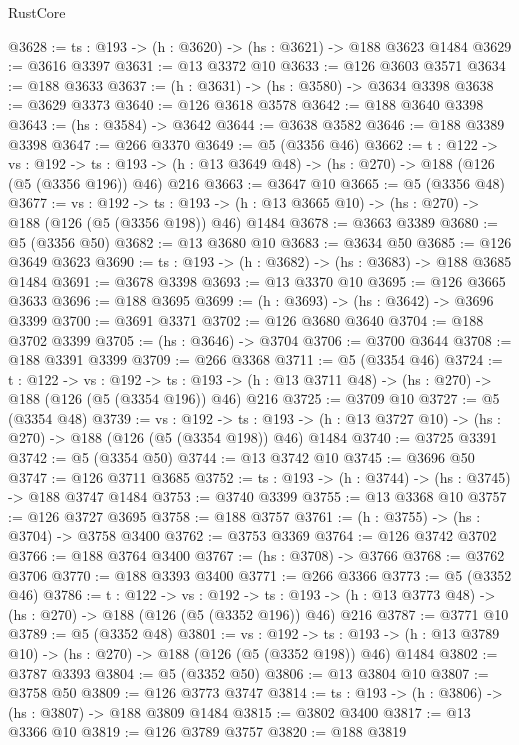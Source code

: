\begin{lexlean}{RustCore}
\begin{coremodule}
@3628 := {ts : @193} -> (h : @3620) -> (hs : @3621) -> @188 @3623 @1484
@3629 := @3616 @3397
@3631 := @13 @3372 @10
@3633 := @126 @3603 @3571
@3634 := @188 @3633
@3637 := (h : @3631) -> (hs : @3580) -> @3634 @3398
@3638 := @3629 @3373
@3640 := @126 @3618 @3578
@3642 := @188 @3640 @3398
@3643 := (hs : @3584) -> @3642
@3644 := @3638 @3582
@3646 := @188 @3389 @3398
@3647 := @266 @3370
@3649 := @5 (@3356 @46)
@3662 := {t : @122} ->
  {vs : @192} ->
  {ts : @193} -> (h : @13 @3649 @48) -> (hs : @270) -> @188 (@126 (@5 (@3356 @196)) @46) @216
@3663 := @3647 @10
@3665 := @5 (@3356 @48)
@3677 := {vs : @192} ->
  {ts : @193} -> (h : @13 @3665 @10) -> (hs : @270) -> @188 (@126 (@5 (@3356 @198)) @46) @1484
@3678 := @3663 @3389
@3680 := @5 (@3356 @50)
@3682 := @13 @3680 @10
@3683 := @3634 @50
@3685 := @126 @3649 @3623
@3690 := {ts : @193} -> (h : @3682) -> (hs : @3683) -> @188 @3685 @1484
@3691 := @3678 @3398
@3693 := @13 @3370 @10
@3695 := @126 @3665 @3633
@3696 := @188 @3695
@3699 := (h : @3693) -> (hs : @3642) -> @3696 @3399
@3700 := @3691 @3371
@3702 := @126 @3680 @3640
@3704 := @188 @3702 @3399
@3705 := (hs : @3646) -> @3704
@3706 := @3700 @3644
@3708 := @188 @3391 @3399
@3709 := @266 @3368
@3711 := @5 (@3354 @46)
@3724 := {t : @122} ->
  {vs : @192} ->
  {ts : @193} -> (h : @13 @3711 @48) -> (hs : @270) -> @188 (@126 (@5 (@3354 @196)) @46) @216
@3725 := @3709 @10
@3727 := @5 (@3354 @48)
@3739 := {vs : @192} ->
  {ts : @193} -> (h : @13 @3727 @10) -> (hs : @270) -> @188 (@126 (@5 (@3354 @198)) @46) @1484
@3740 := @3725 @3391
@3742 := @5 (@3354 @50)
@3744 := @13 @3742 @10
@3745 := @3696 @50
@3747 := @126 @3711 @3685
@3752 := {ts : @193} -> (h : @3744) -> (hs : @3745) -> @188 @3747 @1484
@3753 := @3740 @3399
@3755 := @13 @3368 @10
@3757 := @126 @3727 @3695
@3758 := @188 @3757
@3761 := (h : @3755) -> (hs : @3704) -> @3758 @3400
@3762 := @3753 @3369
@3764 := @126 @3742 @3702
@3766 := @188 @3764 @3400
@3767 := (hs : @3708) -> @3766
@3768 := @3762 @3706
@3770 := @188 @3393 @3400
@3771 := @266 @3366
@3773 := @5 (@3352 @46)
@3786 := {t : @122} ->
  {vs : @192} ->
  {ts : @193} -> (h : @13 @3773 @48) -> (hs : @270) -> @188 (@126 (@5 (@3352 @196)) @46) @216
@3787 := @3771 @10
@3789 := @5 (@3352 @48)
@3801 := {vs : @192} ->
  {ts : @193} -> (h : @13 @3789 @10) -> (hs : @270) -> @188 (@126 (@5 (@3352 @198)) @46) @1484
@3802 := @3787 @3393
@3804 := @5 (@3352 @50)
@3806 := @13 @3804 @10
@3807 := @3758 @50
@3809 := @126 @3773 @3747
@3814 := {ts : @193} -> (h : @3806) -> (hs : @3807) -> @188 @3809 @1484
@3815 := @3802 @3400
@3817 := @13 @3366 @10
@3819 := @126 @3789 @3757
@3820 := @188 @3819

\end{coremodule}
\end{lexlean}
